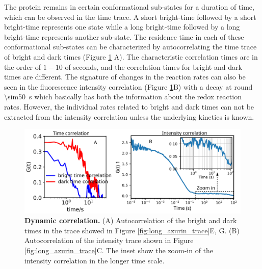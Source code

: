 The protein remains in certain conformational sub-states for a duration of time, which can be observed in the time trace.
A short bright-time followed by a short bright-time represents one state while a long bright-time followed by a long bright-time represents another sub-state.
The residence time in each of these conformational sub-states can be characterized by autocorrelating the time trace of bright and dark times (Figure \ref{fig:Dynamic_corr} A).
The characteristic correlation times are in the order of $1-10$ of seconds, and the correlation times for bright and dark times are different.
The signature of changes in the reaction rates can also be seen in the fluorescence intensity correlation (Figure \ref{fig:Dynamic_corr}B) with a decay at round \SI{\sim50}{\s} which basically has both the information about the redox reaction rates.
However, the individual rates related to bright and dark times can not be extracted from the intensity correlation unless the underlying kinetics is known.
\begin{figure}
	\centering
	\includegraphics[width=\textwidth]{Dynamic_corr}
	\caption{\textbf{Dynamic correlation.} (A) Autocorrelation of the bright and dark times in the trace showed in Figure \ref{fig:long_azurin_trace}E, G. (B) Autocorrelation of the intensity trace shown in Figure \ref{fig:long_azurin_trace}C. The inset show the zoom-in of the intensity correlation in the longer time scale.}
	\label{fig:Dynamic_corr}
\end{figure}


